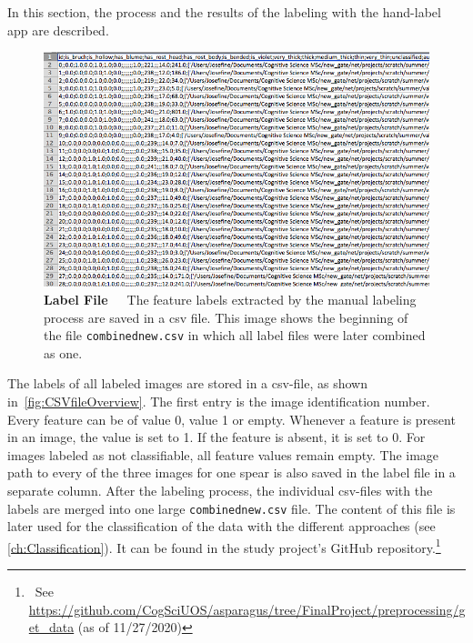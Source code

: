 In this section, the process and the results of the labeling with the hand-label app are described.

\begin{figure}[!ht]
	\centering
	\includegraphics[scale=0.5]{Figures/chapter03/csv_overview.png}
	\decoRule
	\caption[Manual Labeling Output CSV-File]{\textbf{Label File}~~~The feature labels extracted by the manual labeling process are saved in a csv file. This image shows the beginning of the file \texttt{combined\textunderscore new.csv} in which all label files were later combined as one.}
	\label{fig:CSVfileOverview}
\end{figure}

The labels of all labeled images are stored in a csv-file, as shown in~\autoref{fig:CSVfileOverview}. The first entry is the image identification number. Every feature can be of value 0, value 1 or empty. Whenever a feature is present in an image, the value is set to 1. If the feature is absent, it is set to 0. For images labeled as not classifiable, all feature values remain empty. The image path to every of the three images for one spear is also saved in the label file in a separate column. After the labeling process, the individual csv-files with the labels are merged into one large \texttt{combined\textunderscore new.csv} file. The content of this file is later used for the classification of the data with the different approaches (see \autoref{ch:Classification}). It can be found in the study project’s GitHub repository.\footnote{~See \url{https://github.com/CogSciUOS/asparagus/tree/FinalProject/preprocessing/get_data} (as of 11/27/2020)}

